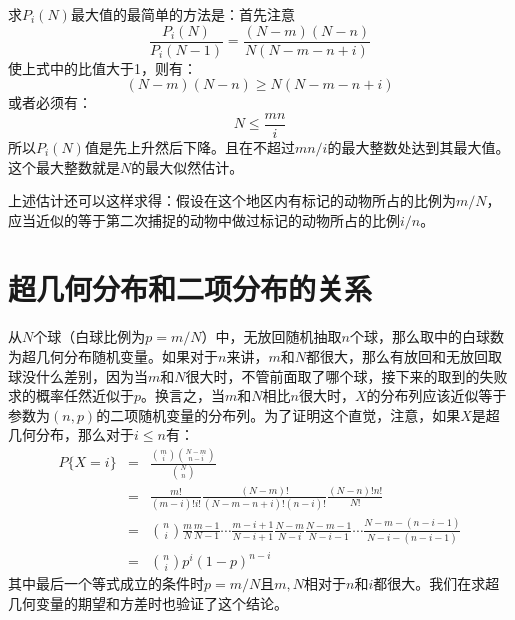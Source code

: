 \documentclass[10pt,a4paper,UTF8]{article}
\begin{document}
求\(P_{i}(N)\)最大值的最简单的方法是：首先注意
\begin{equation}
\label{eq:11}
\frac{P_{i}(N)}{P_{i}(N-1)} = \frac{(N-m)(N-n)}{N(N-m-n+i)}
\end{equation}
使上式中的比值大于1，则有：
\begin{equation}
\label{eq:12}
(N-m)(N-n) \geq N(N-m-n+i)
\end{equation}
或者必须有：
\begin{equation}
\label{eq:13}
N \leq \frac{mn}{i}
\end{equation}
所以\(P_{i}(N)\)值是先上升然后下降。且在不超过\(mn/i\)的最大整数处达到其最大值。这个最大整数就是\(N\)的最大似然估计。

上述估计还可以这样求得：假设在这个地区内有标记的动物所占的比例为\(m/N\)，应当近似的等于第二次捕捉的动物中做过标记的动物所占的比例\(i/n\)。
\section{超几何分布和二项分布的关系}
\label{sec:org5f1972c}


从\(N\)个球（白球比例为\(p = m/N\)）中，无放回随机抽取\(n\)个球，那么取中的白球数为超几何分布随机变量。如果对于\(n\)来讲，\(m\)和\(N\)都很大，那么有放回和无放回取球没什么差别，因为当\(m\)和\(N\)很大时，不管前面取了哪个球，接下来的取到的失败求的概率任然近似于\(p\)。换言之，当\(m\)和\(N\)相比\(n\)很大时，\(X\)的分布列应该近似等于参数为\((n,p)\)的二项随机变量的分布列。为了证明这个直觉，注意，如果\(X\)是超几何分布，那么对于\(i\leq n\)有：
\begin{eqnarray}
\label{eq:15}
P\{X=i\}&=& \frac{\binom{m}{i}\binom{N-m}{n-i}}{\binom{N}{n}} \\
&=&\frac{m!}{(m-i)!i!}\frac{(N-m)!}{(N-m-n+i)!(n-i)!}\frac{(N-n)!n!}{N!}\\
&=&\binom{n}{i} \frac{m}{N}\frac{m-1}{N-1}\cdots\frac{m-i+1}{N-i+1}\frac{N-m}{N-i}\frac{N-m-1}{N-i-1}\cdots \frac{N-m-(n-i-1)}{N-i-(n-i-1)} \\
&=&\binom{n}{i}p^{i}(1-p)^{n-i}
\end{eqnarray}
其中最后一个等式成立的条件时\(p=m/N\)且\(m,N\)相对于\(n\)和\(i\)都很大。我们在求超几何变量的期望和方差时也验证了这个结论。
\end{document}
